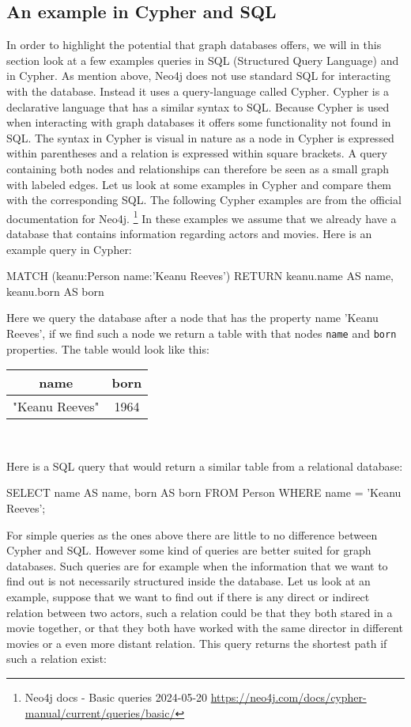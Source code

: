 \subsection{An example in Cypher and SQL}
In order to highlight the potential that graph databases offers, we will in this section look at a few examples queries in SQL (Structured Query Language) and in Cypher. 
As mention above, Neo4j does not use standard SQL for interacting with the database. Instead it uses a query-language called Cypher. Cypher is a declarative language that has a similar syntax to SQL. Because Cypher is used when interacting with graph databases it offers some functionality not found in SQL. The syntax in Cypher is visual in nature as a node in Cypher is expressed within parentheses and a relation is expressed within square brackets. A query containing both nodes and relationships can therefore be seen as a small graph with labeled edges. Let us look at some examples in Cypher and compare them with the corresponding SQL. The following Cypher examples are from the official documentation for Neo4j. \footnote{Neo4j docs - Basic queries 2024-05-20 \url{https://neo4j.com/docs/cypher-manual/current/queries/basic/}} In these examples we assume that we already have a database that contains information regarding actors and movies. Here is an example query in Cypher:
\begin{sqlCode}
  MATCH (keanu:Person {name:'Keanu Reeves'})
  RETURN keanu.name AS name, keanu.born AS born
\end{sqlCode}
Here we query the database after a node that has the property name 'Keanu Reeves', if we find such a node we return a table with that nodes \texttt{name} and \texttt{born} properties. The table would look like this:
\begin{center}
  \begin{tabular}{|c|c|}
    \hline
    name           & born \\
    \hline
    "Keanu Reeves" & 1964 \\
    \hline
  \end{tabular}\\
\end{center}
Here is a SQL query that would return a similar table from a relational database:


\begin{sqlCode}
SELECT
  name AS name,
  born AS born
FROM
  Person
WHERE
  name = 'Keanu Reeves';
\end{sqlCode}

For simple queries as the ones above there are little to no difference between Cypher and SQL. However some kind of queries are better suited for graph databases. Such queries are for example when the information that we want to find out is not necessarily structured inside the database. Let us look at an example, suppose that we want to find out if there is any direct or indirect relation between two actors, such a relation could be that they both stared in a movie together, or that they both have worked with the same director in different movies or a even more distant relation. This query returns the shortest path if such a relation exist:

